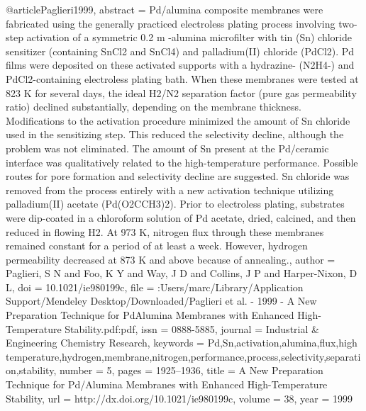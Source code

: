 @article{Paglieri1999,
abstract = {Pd/alumina composite membranes were fabricated using the generally practiced electroless plating process involving two-step activation of a symmetric 0.2 m -alumina microfilter with tin (Sn) chloride sensitizer (containing SnCl2 and SnCl4) and palladium(II) chloride (PdCl2). Pd films were deposited on these activated supports with a hydrazine- (N2H4-) and PdCl2-containing electroless plating bath. When these membranes were tested at 823 K for several days, the ideal H2/N2 separation factor (pure gas permeability ratio) declined substantially, depending on the membrane thickness. Modifications to the activation procedure minimized the amount of Sn chloride used in the sensitizing step. This reduced the selectivity decline, although the problem was not eliminated. The amount of Sn present at the Pd/ceramic interface was qualitatively related to the high-temperature performance. Possible routes for pore formation and selectivity decline are suggested. Sn chloride was removed from the process entirely with a new activation technique utilizing palladium(II) acetate (Pd(O2CCH3)2). Prior to electroless plating, substrates were dip-coated in a chloroform solution of Pd acetate, dried, calcined, and then reduced in flowing H2. At 973 K, nitrogen flux through these membranes remained constant for a period of at least a week. However, hydrogen permeability decreased at 873 K and above because of annealing.},
author = {Paglieri, S N and Foo, K Y and Way, J D and Collins, J P and Harper-Nixon, D L},
doi = {10.1021/ie980199c},
file = {:Users/marc/Library/Application Support/Mendeley Desktop/Downloaded/Paglieri et al. - 1999 - A New Preparation Technique for PdAlumina Membranes with Enhanced High-Temperature Stability.pdf:pdf},
issn = {0888-5885},
journal = {Industrial {\&} Engineering Chemistry Research},
keywords = {Pd,Sn,activation,alumina,flux,high temperature,hydrogen,membrane,nitrogen,performance,process,selectivity,separation,stability},
number = {5},
pages = {1925--1936},
title = {{A New Preparation Technique for Pd/Alumina Membranes with Enhanced High-Temperature Stability}},
url = {http://dx.doi.org/10.1021/ie980199c},
volume = {38},
year = {1999}
}
